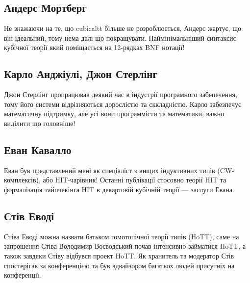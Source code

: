 \subsection*{Андерс Мортберг}

Не знажаючи на те, що cubicaltt більше не розроблюється,
Андерс жартує, що він ідеальний, тому нема далі що покращувати.
Наймінімальніший синтаксис кубічної теорії який поміщається на
12-рядках BNF нотації!

\subsection*{Карло Анджіулі, Джон Стерлінг}

Джон Стерлінг пропрацював деякий час в індустрії програмного
забепечення, тому його системи відрізняються дорослістю та
сккладністю. Карло забезпечує математичну підтримку, але усі
вони программісти та математики, важно виділити що головніше!

\subsection*{Еван Кавалло}

Еван був представлений мені як спеціаліст з вищих індуктивних
типів (CW-комплексів), або HIT-чарівник! Останні публікації
стосовно теорії HIT та формалізація тайпчекінга HIT в декартовій
кубічній теорії --- заслуги Евана.

\subsection*{Стів Еводі}

Стіва Еводі можна назвати батьком гомотопічної теорії типів (HoTT),
саме на запрошення Стіва Володимир Воєводський почав інтенсивно
займатися HoTT, а також завдяки Стіву відбувся проект HoTT. Як
хранитель та модератор Стів спостерігав за конференцією та був
адвайзором багатьох людей присутніх на конференції.


